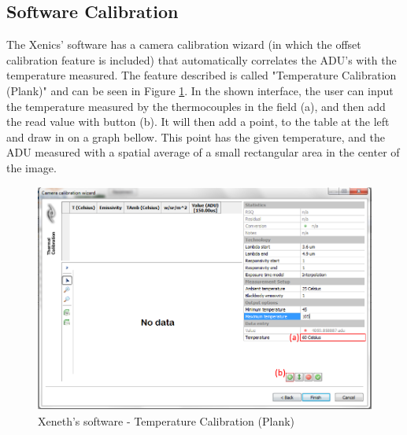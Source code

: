 \subsection{Software Calibration}

\par The Xenics' software has a camera calibration wizard (in which the offset calibration feature is included) that automatically correlates the ADU's with the temperature measured. The feature described is called "Temperature Calibration (Plank)" and can be seen in Figure \ref{fig:plankcalib}. In the shown interface, the user can input the temperature measured by the thermocouples in the field (a), and then add the read value with button (b). It will then add a point, to the table at the left and draw in on a graph bellow. This point has the given temperature, and the ADU measured with a spatial average of a small rectangular area in the center of the image. \\

\begin{figure}[h]
\centering
\includegraphics[width=0.7\linewidth]{Figures/4.Chapter/plankcalib.png}
\caption{Xeneth's software - Temperature Calibration (Plank)}
\label{fig:plankcalib}
\end{figure}

